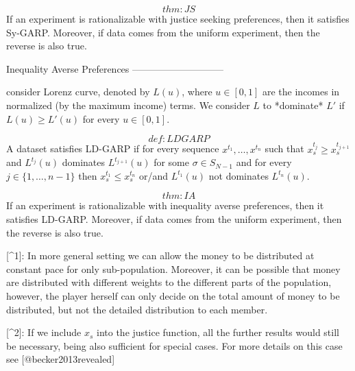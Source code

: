 \[thm:JS\] If an experiment is rationalizable with justice seeking
preferences, then it satisfies Sy-GARP. Moreover, if data comes from the
uniform experiment, then the reverse is also true.

Inequality Averse Preferences
-----------------------------

consider Lorenz curve, denoted by $L(u)$, where $u\in[0,1]$ are the incomes in
normalized (by the maximum income) terms. We consider $L$ to
*dominate* $L'$ if $L(u)\geq L'(u)$ for every $u\in[0,1]$.

\[def:LDGARP\] A dataset satisfies LD-GARP if for every sequence
$x^{t_1},\ldots,x^{t_n}$ such that $x^{t_j}_s\geq x^{t_{j+1}}_s$ and
$L^{t_j}(u)$ dominates $L^{t_{j+1}}(u)$ for some $\sigma\in S_{N-1}$ and
for every $j\in \{1,\ldots,n-1\}$ then $x^{t_1}_s\leq x^{t_{n}}_s$
or/and $L^{t_1}(u)$ not dominates $L^{t_{n}}(u)$.

\[thm:IA\] If an experiment is rationalizable with inequality averse
preferences, then it satisfies LD-GARP. Moreover, if data comes from the
uniform experiment, then the reverse is also true.

[^1]: In more general setting we can allow the money to be distributed
    at constant pace for only sub-population. Moreover, it can be
    possible that money are distributed with different weights to the
    different parts of the population, however, the player herself can
    only decide on the total amount of money to be distributed, but not
    the detailed distribution to each member.

[^2]: If we include $x_s$ into the justice function, all the further
    results would still be necessary, being also sufficient for special
    cases. For more details on this case see [@becker2013revealed]
